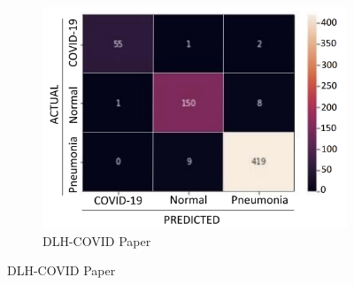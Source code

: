 \begin{figure}[htbp]
    \captionsetup[subfigure]{justification=centering}
    \centering
    \begin{subfigure}{.35\textwidth}
        \centering
        \includegraphics[width=\linewidth]{imgs/dlh_covid_paper_heatmap.png}
        \caption{DLH-COVID Paper}
        \label{fig:dlh_original_heatmap}
    \end{subfigure}


\end{figure}
